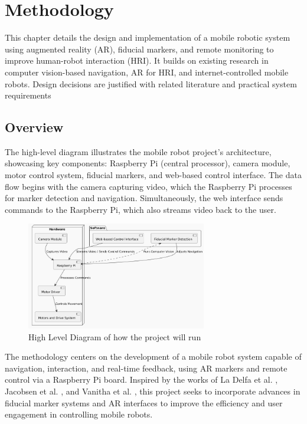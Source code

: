 \chapter{\label{ch:methodology} Methodology}
This chapter details the design and implementation of a mobile robotic system using augmented reality (AR), fiducial markers, and remote monitoring to improve human-robot interaction (HRI). It builds on existing research in computer vision-based navigation, AR for HRI, and internet-controlled mobile robots. Design decisions are justified with related literature and practical system requirements
\section{\label{sec:overview} Overview}

The high-level diagram illustrates the mobile robot project's architecture, showcasing key components: Raspberry Pi (central processor), camera module, motor control system, fiducial markers, and web-based control interface. The data flow begins with the camera capturing video, which the Raspberry Pi processes for marker detection and navigation. Simultaneously, the web interface sends commands to the Raspberry Pi, which also streams video back to the user. 

\begin{figure}[H]
    \centering
    \includegraphics[width=0.7\textwidth]{ch3/figs/diagram.png}
    \caption{High Level Diagram of how the project will run}
    \label{fig:high_level_diagram}
\end{figure}

The methodology centers on the development of a mobile robot system capable of navigation, interaction, and real-time feedback, using AR markers and remote control via a Raspberry Pi board. Inspired by the works of La Delfa et al. \cite{delfa2015}, Jacobsen et al. \cite{jacobsen2018}, and Vanitha et al. \cite{vanitha2016}, this project seeks to incorporate advances in fiducial marker systems and AR interfaces to improve the efficiency and user engagement in controlling mobile robots.


